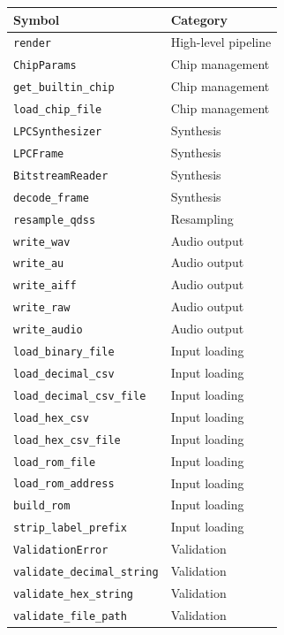 \documentclass[10pt]{article}
\begin{document}
\begin{center}
\begin{tabular}{ll}
\toprule
Symbol & Category \\
\midrule
\texttt{render}              & High-level pipeline \\
\texttt{ChipParams}          & Chip management \\
\texttt{get\_builtin\_chip}  & Chip management \\
\texttt{load\_chip\_file}    & Chip management \\
\texttt{LPCSynthesizer}      & Synthesis \\
\texttt{LPCFrame}            & Synthesis \\
\texttt{BitstreamReader}     & Synthesis \\
\texttt{decode\_frame}       & Synthesis \\
\texttt{resample\_qdss}      & Resampling \\
\texttt{write\_wav}          & Audio output \\
\texttt{write\_au}           & Audio output \\
\texttt{write\_aiff}         & Audio output \\
\texttt{write\_raw}          & Audio output \\
\texttt{write\_audio}        & Audio output \\
\texttt{load\_binary\_file}  & Input loading \\
\texttt{load\_decimal\_csv}  & Input loading \\
\texttt{load\_decimal\_csv\_file} & Input loading \\
\texttt{load\_hex\_csv}      & Input loading \\
\texttt{load\_hex\_csv\_file}& Input loading \\
\texttt{load\_rom\_file}     & Input loading \\
\texttt{load\_rom\_address}  & Input loading \\
\texttt{build\_rom}          & Input loading \\
\texttt{strip\_label\_prefix}& Input loading \\
\texttt{ValidationError}     & Validation \\
\texttt{validate\_decimal\_string} & Validation \\
\texttt{validate\_hex\_string} & Validation \\
\texttt{validate\_file\_path} & Validation \\
\bottomrule
\end{tabular}
\end{center}
\end{document}
